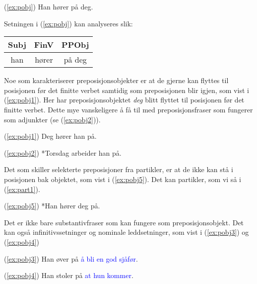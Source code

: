 \documentclass{article}
\begin{document}
\begin{exe} 
\ex\label{ex:pobj} (\ref{ex:pobj}) Han h{\o}rer p{\aa} deg.
\end{exe}

Setningen i (\ref{ex:pobj}) kan analyseres slik:

\begin{table}[!ht]
\begin{tabular}{|c|c|c|}
\hline
Subj & FinV & PPObj\\\hline
han & h{\o}rer & p{\aa} deg\\\hline
\end{tabular}
\end{table}


Noe som karakteriserer preposisjonsobjekter er at de gjerne kan flyttes til posisjonen f{\o}r det finitte verbet samtidig som preposisjonen blir igjen, som vist i (\ref{ex:pobj1}). Her har preposisjonsobjektet {\it deg} blitt flyttet til posisjonen f{\o}r det finitte verbet. Dette mye vanskeligere {\aa} f{\aa} til med preposisjonsfraser som fungerer som adjunkter (se (\ref{ex:pobj2})).

\begin{exe} 
\ex\label{ex:pobj1} (\ref{ex:pobj1}) Deg h{\o}rer han p{\aa}.
\end{exe}

\begin{exe} 
\ex\label{ex:pobj2} (\ref{ex:pobj2}) *Torsdag arbeider han p{\aa}.
\end{exe}

Det som skiller selekterte preposisjoner fra partikler, er at de ikke kan st{\aa} i posisjonen bak objektet, som vist i (\ref{ex:pobj5}). Det kan partikler, som vi s{\aa} i (\ref{ex:part1}).

\begin{exe} 
\ex\label{ex:pobj5} (\ref{ex:pobj5}) *Han h{\o}rer deg p{\aa}.
\end{exe}

Det er ikke bare substantivfraser som kan fungere som preposisjonsobjekt. Det kan ogs{\aa} infinitivssetninger og nominale leddsetninger, som vist i (\ref{ex:pobj3}) og (\ref{ex:pobj4})

\begin{exe} 
\ex
\begin{xlist}
\ex\label{ex:pobj3} (\ref{ex:pobj3}) Han {\o}ver p{\aa} \textcolor{blue}{{\aa} bli en god sj{\aa}f{\o}r}.

\ex\label{ex:pobj4} (\ref{ex:pobj4}) Han stoler p{\aa} \textcolor{blue}{at hun kommer}.
\end{xlist}
\end{exe}
\end{document}
